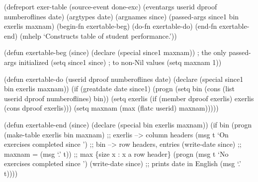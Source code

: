 \begin{tpsexample}

(defreport exer-table
  (source-event done-exc)
  (eventargs userid dproof numberoflines date)
  (argtypes date)
  (argnames since)
  (passed-args since1 bin exerlis maxnam)
  (begin-fn exertable-beg)
  (do-fn exertable-do)
  (end-fn exertable-end)
  (mhelp `Constructs table of student performance.'))

(defun exertable-beg (since)
  (declare (special since1 maxnam))	; the only passed-args initialized
  (setq since1 since)                   ; to non-Nil values
  (setq maxnam 1))

(defun exertable-do (userid dproof numberoflines date)
  (declare (special since1 bin exerlis maxnam))
  (if (greatdate date since1)
      (progn
       (setq bin (cons (list userid dproof numberoflines) bin))
       (setq exerlis
	     (if (member dproof exerlis) exerlis (cons dproof exerlis)))
       (setq maxnam (max (flatc userid) maxnam)))))

(defun exertable-end (since)
  (declare (special bin exerlis maxnam))
  (if bin
      (progn
       (make-table exerlis bin maxnam)         ;; exerlis --> column headers
       (msg t `On exercises completed since ') ;; bin --> row headers, entries
       (write-date since)                      ;; maxnam =
       (msg `.' t))                            ;; max \{size x : x a row header\}
      (progn
       (msg t `No exercises completed since ')
       (write-date since)                      ;; prints date in English
       (msg `.' t))))

\end{tpsexample}
% 
% 
